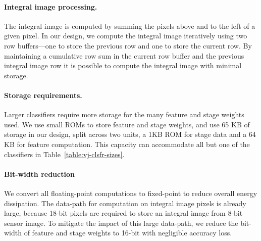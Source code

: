 %
\paragraph{Integral image processing.} The integral image is computed by summing the pixels above and to the left of
a given pixel. In our design, we
compute the integral image iteratively using two row buffers---one to store the
previous row and one to store the current row. By maintaining
a cumulative row sum in the current row buffer and the previous integral image row
it is possible to compute the integral image with minimal storage.




\paragraph{Storage requirements.}
Larger classifiers require more storage for the many feature and stage weights used.
We use small ROMs to store feature and stage weights, and use 65 KB of storage in our design,
split across two units, a 1KB ROM for stage data and a 64 KB for feature computation. This capacity
can accommodate all but one of the classifiers in Table~\ref{table:vj-clsfr-sizes}.

\paragraph{Bit-width reduction} We convert all floating-point computations
to fixed-point to reduce overall energy dissipation. The
data-path for computation on integral image pixels is already large, because 18-bit pixels are
required to store an integral image from 8-bit sensor image. To mitigate the impact of this large data-path,
we reduce the bit-width of feature and stage weights to 16-bit with negligible accuracy loss.

